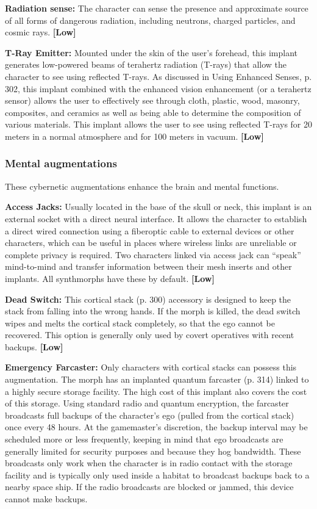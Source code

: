 \textbf{Radiation sense:} The character can sense the presence and approximate source of all forms of dangerous radiation, including neutrons, charged particles, and cosmic rays. \textbf{[Low]} 

\textbf{T-Ray Emitter:} Mounted under the skin of the user’s forehead, this implant generates low-powered beams of terahertz radiation (T-rays) that allow the character to see using reflected T-rays. As discussed in Using Enhanced Senses, p. 302, this implant combined with the enhanced vision enhancement (or a terahertz sensor) allows the user to effectively see through cloth, plastic, wood, masonry, composites, and ceramics as well as being able to determine the composition of various materials. This implant allows the user to see using reflected T-rays for 20 meters in a normal atmosphere and for 100 meters in vacuum. \textbf{[Low]} 

\subsubsection{Mental augmentations} 

These cybernetic augmentations enhance the brain and mental functions. 

\textbf{Access Jacks:} Usually located in the base of the skull or neck, this implant is an external socket with a direct neural interface. It allows the character to establish a direct wired connection using a fiberoptic cable to external devices or other characters, which can be useful in places where wireless links are unreliable or complete privacy is required. Two characters linked via access jack can ``speak'' mind-to-mind and transfer information between their mesh inserts and other implants. All synthmorphs have these by default. \textbf{[Low]} 

\textbf{Dead Switch:} This cortical stack (p. 300) accessory is designed to keep the stack from falling into the wrong hands. If the morph is killed, the dead switch wipes and melts the cortical stack completely, so that the ego cannot be recovered. This option is generally only used by covert operatives with recent backups. \textbf{[Low]} 

\textbf{Emergency Farcaster:} Only characters with cortical stacks can possess this augmentation. The morph has an implanted quantum farcaster (p. 314) linked to a highly secure storage facility. The high cost of this implant also covers the cost of this storage. Using standard radio and quantum encryption, the farcaster broadcasts full backups of the character’s ego (pulled from the cortical stack) once every 48 hours. At the gamemaster’s discretion, the backup interval may be scheduled more or less frequently, keeping in mind that ego broadcasts are generally limited for security purposes and because they hog bandwidth. These broadcasts only work when the character is in radio contact with the storage facility and is typically only used inside a habitat to broadcast backups back to a nearby space ship. If the radio broadcasts are blocked or jammed, this device cannot make backups. 


